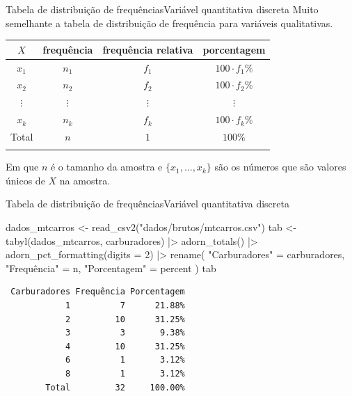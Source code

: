 \documentclass[
  10pt,
  ignorenonframetext,
]{beamer}
\newenvironment{Shaded}{\begin{snugshade}}{\end{snugshade}}
\newcommand{\AttributeTok}[1]{\textcolor[rgb]{0.40,0.45,0.13}{#1}}
\newcommand{\DecValTok}[1]{\textcolor[rgb]{0.68,0.00,0.00}{#1}}
\newcommand{\FunctionTok}[1]{\textcolor[rgb]{0.28,0.35,0.67}{#1}}
\newcommand{\NormalTok}[1]{\textcolor[rgb]{0.00,0.23,0.31}{#1}}
\newcommand{\OtherTok}[1]{\textcolor[rgb]{0.00,0.23,0.31}{#1}}
\newcommand{\SpecialCharTok}[1]{\textcolor[rgb]{0.37,0.37,0.37}{#1}}
\newcommand{\StringTok}[1]{\textcolor[rgb]{0.13,0.47,0.30}{#1}}
\begin{document}
\begin{frame}{Tabela de distribuição de frequências\newline Variável
quantitativa discreta}
\protect\hypertarget{tabela-de-distribuiuxe7uxe3o-de-frequuxeanciasvariuxe1vel-quantitativa-discreta}{}
Muito semelhante a tabela de distribuição de frequência para variáveis
qualitativas.

\begin{longtable}[]{@{}cccc@{}}
\toprule\noalign{}
\(X\) & frequência & frequência relativa & porcentagem \\
\midrule\noalign{}
\endhead
\(x_1\) & \(n_1\) & \(f_1\) & \(100 \cdot f_1\%\) \\
\(x_2\) & \(n_2\) & \(f_2\) & \(100 \cdot f_2\%\) \\
\(\vdots\) & \(\vdots\) & \(\vdots\) & \(\vdots\) \\
\(x_k\) & \(n_k\) & \(f_k\) & \(100 \cdot f_k\%\) \\
Total & \(n\) & \(1\) & \(100\%\) \\
\bottomrule\noalign{}
\end{longtable}

Em que \(n\) é o tamanho da amostra e \(\{x_1, \dots, x_k\}\) são os
números que são valores únicos de \(X\) na amostra.
\end{frame}

\begin{frame}[fragile]{Tabela de distribuição de
frequências\newline Variável quantitativa discreta}
\protect\hypertarget{tabela-de-distribuiuxe7uxe3o-de-frequuxeanciasvariuxe1vel-quantitativa-discreta-1}{}
\begin{Shaded}
\begin{Highlighting}[]
\NormalTok{dados\_mtcarros }\OtherTok{\textless{}{-}} \FunctionTok{read\_csv2}\NormalTok{(}\StringTok{"dados/brutos/mtcarros.csv"}\NormalTok{)}
\NormalTok{tab }\OtherTok{\textless{}{-}} \FunctionTok{tabyl}\NormalTok{(dados\_mtcarros, carburadores)  }\SpecialCharTok{|\textgreater{}}
  \FunctionTok{adorn\_totals}\NormalTok{()  }\SpecialCharTok{|\textgreater{}}
  \FunctionTok{adorn\_pct\_formatting}\NormalTok{(}\AttributeTok{digits =} \DecValTok{2}\NormalTok{) }\SpecialCharTok{|\textgreater{}}
  \FunctionTok{rename}\NormalTok{(}
    \StringTok{"Carburadores"} \OtherTok{=}\NormalTok{ carburadores, }\StringTok{"Frequência"} \OtherTok{=}\NormalTok{ n,}
    \StringTok{"Porcentagem"} \OtherTok{=}\NormalTok{ percent}
\NormalTok{  )}
\NormalTok{tab}
\end{Highlighting}
\end{Shaded}

\begin{verbatim}
 Carburadores Frequência Porcentagem
            1          7      21.88%
            2         10      31.25%
            3          3       9.38%
            4         10      31.25%
            6          1       3.12%
            8          1       3.12%
        Total         32     100.00%
\end{verbatim}
\end{frame}
\end{document}

